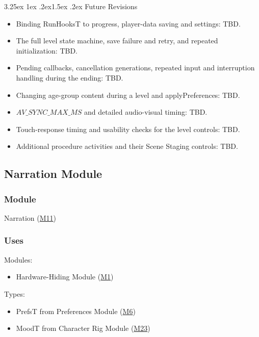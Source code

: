 \documentclass[10pt, titlepage]{article}
\makeatletter
\newcommand{\misref}[2]{\hyperref[mis:#1]{M#2}}
\renewcommand\paragraph{\@startsection{paragraph}{4}{\z@}%
  {3.25ex \@plus 1ex \@minus .2ex}{1.5ex \@plus .2ex}%
  {\normalfont\normalsize\bfseries}}
\newcommand{\T}[1]{\mathit{#1}}          %
\makeatother
\begin{document}
\par\pagebreak[0]
\begin{samepage}
\paragraph{Future Revisions}

\begin{itemize}
\item Binding RunHooksT to progress, player-data saving and settings: TBD.
\item The full level state machine, save failure and retry, and repeated
  initialization: TBD.
\item Pending callbacks, cancellation generations, repeated input and
  interruption handling during the ending: TBD.
\item Changing age-group content during a level and applyPreferences: TBD.
\item $\T{AV\_SYNC\_MAX\_MS}$ and detailed audio-visual timing: TBD.
\item Touch-response timing and usability checks for the level controls: TBD.
\item Additional procedure activities and their Scene Staging controls: TBD.
\end{itemize}
\end{samepage}
\par\pagebreak[0]

\newpage
\subsection{Narration Module} \label{mis:Narration}

\subsubsection{Module}

Narration (\misref{Narration}{11})

\subsubsection{Uses}

Modules:
\begin{itemize}
\item Hardware-Hiding Module (\misref{HH}{1})
\end{itemize}

Types:
\begin{itemize}
\item PrefsT from Preferences Module (\misref{Prefs}{6})
\item MoodT from Character Rig Module (\misref{Rig}{23})
\end{itemize}
\end{document}
